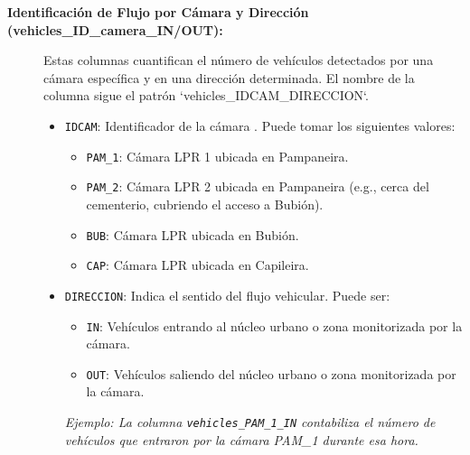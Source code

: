 \begin{description}
    \item[\textbf{Identificación de Flujo por Cámara y Dirección (vehicles\_ID\_camera\_IN/OUT):}]
    Estas columnas cuantifican el número de vehículos detectados por una cámara específica y en una dirección determinada. El nombre de la columna sigue el patrón `vehicles\_IDCAM\_DIRECCION`.
        \begin{itemize}
            \item \texttt{IDCAM}: Identificador de la cámara . Puede tomar los siguientes valores:
                \begin{itemize}
                    \item \texttt{PAM\_1}: Cámara LPR 1 ubicada en Pampaneira.
                    \item \texttt{PAM\_2}: Cámara LPR 2 ubicada en Pampaneira (e.g., cerca del cementerio, cubriendo el acceso a Bubión).
                    \item \texttt{BUB}: Cámara LPR ubicada en Bubión.
                    \item \texttt{CAP}: Cámara LPR ubicada en Capileira.
                \end{itemize}
            \item \texttt{DIRECCION}: Indica el sentido del flujo vehicular. Puede ser:
                \begin{itemize}
                    \item \texttt{IN}: Vehículos entrando al núcleo urbano o zona monitorizada por la cámara.
                    \item \texttt{OUT}: Vehículos saliendo del núcleo urbano o zona monitorizada por la cámara.
                \end{itemize}
            \textit{Ejemplo: La columna \texttt{vehicles\_PAM\_1\_IN} contabiliza el número de vehículos que entraron por la cámara PAM\_1 durante esa hora.}
        \end{itemize}


\end{description}
